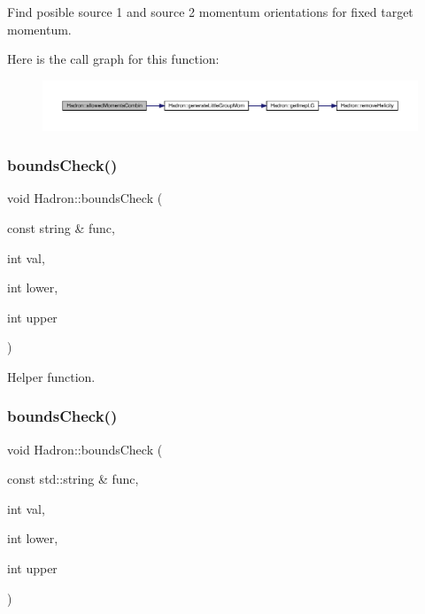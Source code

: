 Find posible source 1 and source 2 momentum orientations for fixed target momentum. 

Here is the call graph for this function\+:\nopagebreak
\begin{figure}[H]
\begin{center}
\leavevmode
\includegraphics[width=350pt]{d1/daf/namespaceHadron_a9aa2554e3522f9947be804d36603b887_cgraph}
\end{center}
\end{figure}
\mbox{\label{namespaceHadron_a73536a97ce9c6804192b72aceb86eb34}} 
\subsubsection{\texorpdfstring{boundsCheck()}{boundsCheck()}\hspace{0.1cm}{\footnotesize\ttfamily [1/2]}}
{\footnotesize\ttfamily void Hadron\+::bounds\+Check (\begin{DoxyParamCaption}\item[{const string \&}]{func,  }\item[{int}]{val,  }\item[{int}]{lower,  }\item[{int}]{upper }\end{DoxyParamCaption})}



Helper function. 

\mbox{\label{namespaceHadron_ae5bce98b9d65d71e6c4d4b63034ed0a1}} 
\subsubsection{\texorpdfstring{boundsCheck()}{boundsCheck()}\hspace{0.1cm}{\footnotesize\ttfamily [2/2]}}
{\footnotesize\ttfamily void Hadron\+::bounds\+Check (\begin{DoxyParamCaption}\item[{const std\+::string \&}]{func,  }\item[{int}]{val,  }\item[{int}]{lower,  }\item[{int}]{upper }\end{DoxyParamCaption})}



